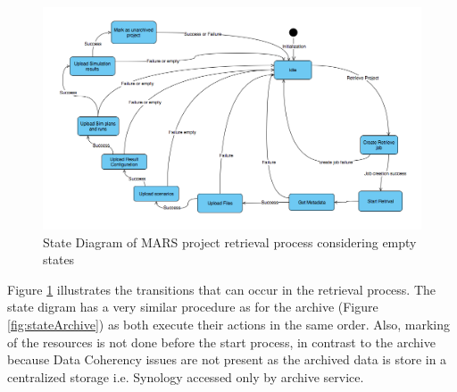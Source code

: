     \begin{figure}[H]
        \centering \includegraphics[scale=0.45]{grafiken/stateRestore.png}
        \caption{State Diagram of MARS project retrieval process considering empty states}
        \label{fig:stateRestore}
    \end{figure}

    Figure \ref{fig:stateRestore} illustrates the transitions that can occur in the retrieval process. The state digram has a very similar procedure as for the
    archive (Figure \ref{fig:stateArchive}) as both execute their actions in the same order. 
    Also, marking of the resources is not done before the start process, in contrast to the archive because Data Coherency issues are not present as the archived
    data is store in a centralized storage i.e. Synology accessed only by archive service.   

    
